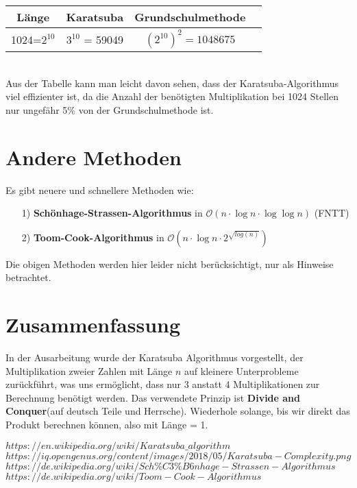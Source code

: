 \documentclass[11pt,a4paper, twoside]{article}
\newtheorem{lemma}[theorem]{Lemma}
\theoremstyle{definition}
\begin{document}
\setlength{\tabcolsep}{7mm}
\begin{tabular}{|c|c|c|p{10cm}<{\centering}}
	\hline
	Länge & Karatsuba & Grundschulmethode\\
	\hline
	1024=$2^{10}$ & $3^{10}$ = 59049 & $(2^{10})^{2} = 1048675$\\
	\hline
\end{tabular}\\ 
Aus der Tabelle kann man leicht davon sehen, dass der Karatsuba-Algorithmus viel effizienter ist, da die Anzahl der benötigten Multiplikation bei 1024 Stellen nur ungefähr 5\% von der Grundschulmethode ist.





\section{Andere Methoden}
Es gibt neuere und schnellere Methoden wie: 
\begin{itemize}
	\item[1)]
	\textbf{Schönhage-Strassen-Algorithmus} in $\mathcal{O}(n \cdot \log{n} \cdot \log{\log{n}})$ (FNTT)\cite{3}
	\item[2)]
	\textbf{Toom-Cook-Algorithmus} in $\mathcal{O}(n \cdot \log{n} \cdot 2^{\sqrt{log{(n)}}})$\cite{4} 
\end{itemize}
Die obigen Methoden werden  hier leider nicht berücksichtigt, nur als Hinweise betrachtet.


\section{Zusammenfassung}
In der Ausarbeitung wurde der Karatsuba Algorithmus vorgestellt, der Multiplikation zweier Zahlen mit Länge \(n\) auf kleinere Unterprobleme zurückführt, was uns ermöglicht, dass nur 3 anstatt 4 Multiplikationen zur Berechnung benötigt werden. Das verwendete Prinzip ist \textbf{Divide and Conquer}(auf deutsch Teile und Herrsche).  Wiederhole solange, bis wir direkt das Produkt berechnen können, also mit Länge = 1. 

\begin{thebibliography}{3}
 $https://en.wikipedia.org/wiki/Karatsuba\_algorithm$
 $https://iq.opengenus.org/content/images/2018/05/Karatsuba-Complexity.png$
 $https://de.wikipedia.org/wiki/Sch\%C3\%B6nhage-Strassen-Algorithmus$
 $https://de.wikipedia.org/wiki/Toom-Cook-Algorithmus$
\end{thebibliography}
\FloatBarrier
\printbibliography
\end{document}
